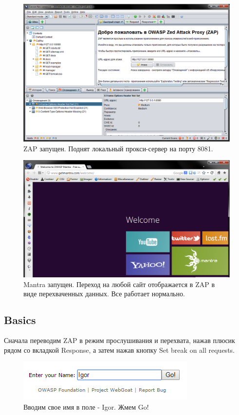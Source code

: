 \documentclass[a4paper, 14pt]{article}				%
\begin{document}
\begin{figure}[h!]
\centering
\includegraphics[width=\textwidth]{rsrc/zap_start}
\caption{ZAP запущен. Поднят локальный прокси-сервер на порту 8081.}
\end{figure}

\begin{figure}[h!]
\centering
\includegraphics[width=\textwidth]{rsrc/mantra_start}
\caption{Mantra запущен. Переход на любой сайт отображается в ZAP в виде перехваченных данных. Все работает нормально.}
\end{figure}

\newpage
\subsection{Basics}
Сначала переводим ZAP в режим прослушивания и перехвата, нажав плюсик рядом со вкладкой Response, а затем нажав кнопку Set break on all requests.
\begin{figure}[h!]
\centering
\includegraphics[width=\textwidth]{rsrc/1_1}
\caption{Вводим свое имя в поле - Igor. Жмем Go!}
\end{figure}
\end{document}
